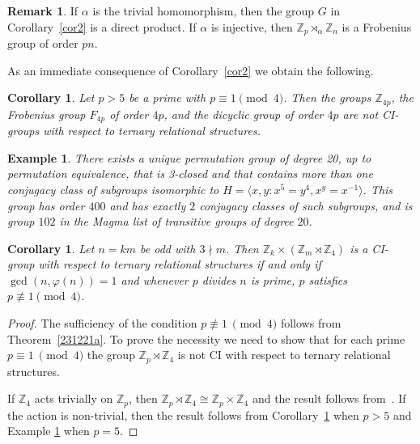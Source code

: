 \documentclass[11pt]{amsart}
\numberwithin{equation}{section}
\newtheorem{cor}[thrm]{Corollary}
\newtheorem{example}[thrm]{Example}
\theoremstyle{definition}
\newtheorem{remark}[thrm]{Remark}
\def\Z{{\mathbb Z}}
\newcommand{\sg}[1]{\langle{#1}\rangle}
\begin{document}
	
	
	\begin{remark} If $\alpha$ is the trivial homomorphism, then the group $G$ in Corollary~\ref{cor2} is a direct product. If $\alpha$ is injective, then $\Z_p\rtimes_\alpha \Z_n$ is a Frobenius group of order $pn$.
	\end{remark}
	
	As an immediate consequence of Corollary~\ref{cor2} we obtain the following.
	
	
	\begin{cor}\label{cor3}
		Let $p > 5$ be a prime with $p \equiv 1 \pmod 4$. Then the groups $\Z_{4p}$, the Frobenius group $F_{4p}$ of order $4p$, and the dicyclic group of order $4p$ are not CI-groups with respect to ternary relational structures.
	\end{cor}
	
	\begin{example}\label{p is 5 sorted}{\rm
			There exists a unique permutation group of degree 20, up to permutation equivalence, that is 3-closed and that contains more than one conjugacy class of subgroups isomorphic to $H=\sg{x,y:x^5=y^4, x^y=x^{-1}}$.  This group has order $400$ and has exactly $2$ conjugacy classes of such subgroups, and is group $102$ in the Magma list of transitive groups of degree $20$.}
	\end{example}
	
	\begin{cor}\label{dicyclic cor}
		Let $n = km$ be odd with $3\nmid m$.  Then $\Z_k\times(\Z_m\rtimes\Z_4)$ is a CI-group with respect to ternary relational structures if and only if $\gcd(n,\varphi(n)) = 1$ and whenever $p$ divides $n$ is prime, $p$ satisfies $p\not\equiv 1 \pmod{4}$.
	\end{cor}
	
	\begin{proof} The sufficiency of the condition $p\not\equiv 1\ \pmod{4}$ follows from Theorem~\ref{231221a}. To prove the necessity we need to show that for each prime $p\equiv 1\ \pmod{4}$ the group $\Z_p\rtimes\Z_4$ is not CI with respect to ternary relational structures.
		
		If $\Z_4$ acts trivially on $\Z_p$, then $\Z_p\rtimes\Z_4\cong \Z_p\times\Z_4$ and the result follows from~\cite[Theorem 4.2]{DobsonS2013}. If the action is non-trivial, then the result follows from Corollary~\ref{cor3} when $p>5$ and Example \ref{p is 5 sorted} when $p=5$.
	\end{proof}
	
\end{document}
